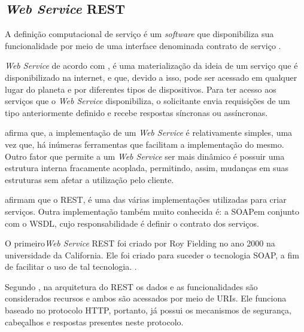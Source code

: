 \subsection{\textit{Web Service} REST}

A definição computacional de serviço é um \textit{software} que disponibiliza sua funcionalidade por meio de uma interface denominada contrato de serviço \cite{erl_soa_with_rest}.

\textit{Web Service} de acordo com , é uma materialização da ideia de um serviço que é disponibilizado na internet, e que, devido a isso, pode ser acessado em qualquer lugar do planeta e por diferentes tipos de dispositivos. Para ter acesso aos serviços que o \textit{Web Service} disponibiliza, o solicitante envia requisições de um tipo anteriormente definido e recebe respostas síncronas ou assíncronas.

 afirma que, a implementação de um \textit{Web Service} é relativamente simples, uma vez que, há inúmeras ferramentas que facilitam a implementação do mesmo. Outro fator que permite a um \textit{Web Service} ser mais dinâmico é possuir uma estrutura interna fracamente acoplada, permitindo, assim, mudanças em suas estruturas sem afetar a utilização pelo cliente.

 afirmam que o REST\footnotemark[20], é uma das várias implementações utilizadas para criar serviços. Outra implementação também muito conhecida é: a SOAP\footnotemark[21] em conjunto com o WSDL\footnotemark[22], cujo responsabilidade é definir o contrato dos serviços.




O primeiro\textit{Web Service} REST foi criado por Roy Fielding no ano 2000 na universidade da California. Ele foi criado para suceder o tecnologia SOAP, a fim de facilitar o uso de tal tecnologia. \cite{ibm_web_service}.

Segundo , na arquitetura do REST os dados e as funcionalidades são considerados recursos e ambos são acessados por meio de  URIs\footnotemark[23]. Ele funciona baseado no protocolo HTTP, portanto, já possui os mecanismos de segurança, cabeçalhos e respostas presentes neste protocolo.

